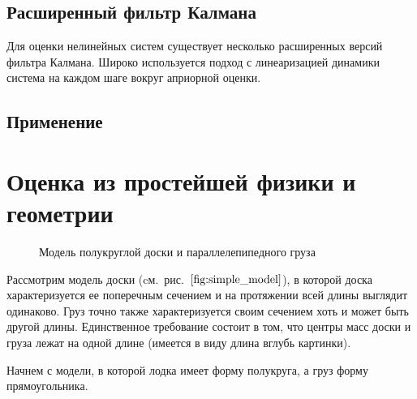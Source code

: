 \documentclass[a4paper]{article}
\begin{document}
\subsection{Расширенный фильтр Калмана}

Для оценки нелинейных систем существует несколько расширенных версий фильтра Калмана. Широко используется подход с линеаризацией динамики система на каждом шаге вокруг априорной оценки. 

\subsection{Применение}

\section{Оценка из простейшей физики и геометрии}

\begin{figure}
	\centering
	\caption{Модель полукруглой доски и параллелепипедного груза}	
	\label{fig:simple_model}
\end{figure}

Рассмотрим модель доски (cм.~рис.~$\ref{fig:simple_model}$), в которой доска характеризуется ее поперечным сечением и на протяжении всей длины выглядит одинаково. Груз точно также характеризуется своим сечением хоть и может быть другой длины. Единственное требование состоит в том, что центры масс доски и груза лежат на одной длине (имеется в виду длина вглубь картинки).

Начнем с модели, в которой лодка имеет форму полукруга, а груз форму прямоугольника.
\end{document}
